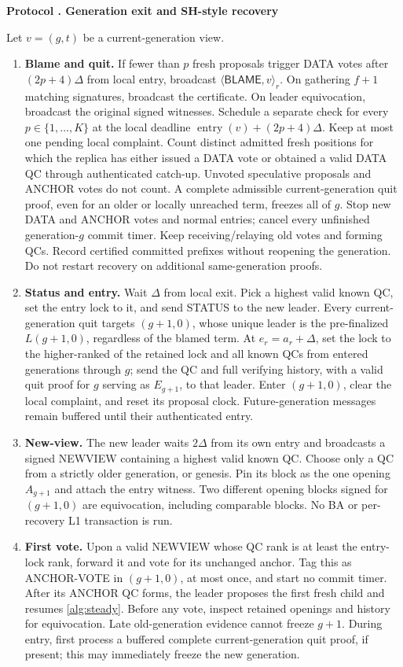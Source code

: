 \documentclass[11pt,a4paper]{article}
\newcommand{\RR}[1]{{\color{rrRed}#1}}
\newcommand{\tagg}[1]{\mathsf{#1}}
\newcounter{protocol}
\newenvironment{protocol}[2]{\refstepcounter{protocol}\label{#1}
\begin{mdframed}[nobreak=true,linewidth=.6pt,skipabove=8pt,skipbelow=8pt,
innertopmargin=7pt,innerbottommargin=7pt]\small
\textbf{Protocol \theprotocol. #2}\par\smallskip}{\end{mdframed}}
\begin{document}
\begin{protocol}{alg:recovery}{Generation exit and SH-style recovery}
Let $v=(g,t)$ be a current-generation view.
\begin{enumerate}[label=\textbf{\roman*)},itemsep=5pt]
\item \textbf{Blame and quit.} If fewer than $p$ fresh proposals trigger
DATA votes after $(2p+4)\Delta$ from local entry, broadcast
$\langle\tagg{BLAME},v\rangle_r$.
On gathering $f+1$ matching signatures, broadcast the certificate.
On leader equivocation, broadcast the original signed witnesses.
\RR{Schedule a separate check for every $p\in\{1,\ldots,K\}$ at the
local deadline $\operatorname{entry}(v)+(2p+4)\Delta$. Keep at most one
pending local complaint. Count distinct admitted fresh positions for which
the replica has either issued a DATA vote or obtained a valid DATA QC
through authenticated catch-up. Unvoted speculative proposals and ANCHOR
votes do not count. A complete admissible current-generation
quit proof, even for an older or locally unreached term, freezes all of $g$.
Stop new DATA and ANCHOR votes and normal entries; cancel every unfinished
generation-$g$ commit timer. Keep receiving/relaying old votes and forming
QCs. Record certified committed prefixes without reopening the generation.
Do not restart recovery on additional same-generation proofs.}
\item \textbf{Status and entry.} Wait $\Delta$ from local exit. Pick a
highest valid known QC, set the entry lock to it, and send STATUS to the
new leader.
\RR{Every current-generation quit targets $(g+1,0)$, whose unique leader
is the pre-finalized $L(g+1,0)$, regardless of the blamed term. At
$e_r=a_r+\Delta$, set the lock to the higher-ranked of the retained lock
and all known QCs from entered generations through $g$; send the QC and
full verifying history, with a valid quit proof for $g$ serving as
$E_{g+1}$, to that leader.
Enter $(g+1,0)$, clear the local complaint, and reset its proposal clock.
Future-generation messages remain buffered until their authenticated entry.}
\item \textbf{New-view.} The new leader waits $2\Delta$ from its own entry
and broadcasts a signed NEWVIEW containing a highest valid known QC.
\RR{Choose only a QC from a strictly older generation, or genesis.
Pin its block as the one opening $A_{g+1}$ and attach the entry witness.
Two different opening blocks signed for $(g+1,0)$ are equivocation,
including comparable blocks. No BA or per-recovery L1 transaction is run.}
\item \textbf{First vote.} Upon a valid NEWVIEW whose QC rank is at least
the entry-lock rank, forward it and vote for its unchanged anchor.
\RR{Tag this as ANCHOR-VOTE in $(g+1,0)$, at most once, and start no commit
timer. After its ANCHOR QC forms, the leader proposes the first fresh child
and resumes \cref{alg:steady}. Before any vote, inspect retained openings
and history for equivocation. Late old-generation evidence cannot freeze
$g+1$. During entry, first process a buffered complete current-generation
quit proof, if present; this may immediately freeze the new generation.}
\end{enumerate}
\end{protocol}
\end{document}
